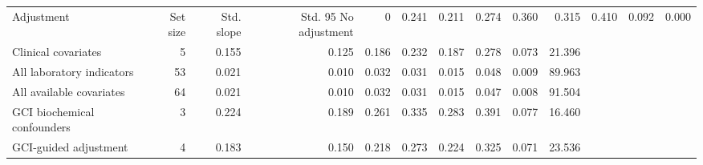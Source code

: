 \begin{tabular}{lrrrrrrrrr}
\toprule
Adjustment & Set size & Std. slope & Std. 95%
\midrule
No adjustment & 0 & 0.241 & 0.211 & 0.274 & 0.360 & 0.315 & 0.410 & 0.092 & 0.000 \\
Clinical covariates & 5 & 0.155 & 0.125 & 0.186 & 0.232 & 0.187 & 0.278 & 0.073 & 21.396 \\
All laboratory indicators & 53 & 0.021 & 0.010 & 0.032 & 0.031 & 0.015 & 0.048 & 0.009 & 89.963 \\
All available covariates & 64 & 0.021 & 0.010 & 0.032 & 0.031 & 0.015 & 0.047 & 0.008 & 91.504 \\
GCI biochemical confounders & 3 & 0.224 & 0.189 & 0.261 & 0.335 & 0.283 & 0.391 & 0.077 & 16.460 \\
GCI-guided adjustment & 4 & 0.183 & 0.150 & 0.218 & 0.273 & 0.224 & 0.325 & 0.071 & 23.536 \\
\bottomrule
\end{tabular}
